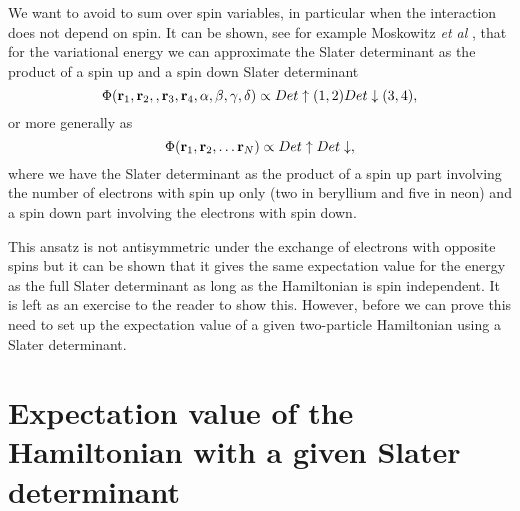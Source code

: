 We want to avoid to sum over spin variables, in particular when the interaction does not depend on spin.
It can be shown, see for example Moskowitz {\em et al} \cite{moskowitz1981,schmidt1982}, 
that for the variational energy
we can approximate the Slater determinant as  the product of a spin up and a spin down Slater determinant
\[
   \Phi({\bf r}_1,{\bf r}_2,,{\bf r}_3,{\bf r}_4, \alpha,\beta,\gamma,\delta) \propto Det\uparrow(1,2)Det\downarrow(3,4),
\]
or more generally as 
\[
   \Phi({\bf r}_1,{\bf r}_2,\dots {\bf r}_N) \propto Det\uparrow Det\downarrow,
\]
where we have the Slater determinant as the product of a spin up part involving the number of electrons 
with spin up only (two in beryllium
and five in neon) and a spin down part involving the electrons with spin down.

This ansatz is not antisymmetric under the exchange of electrons with  opposite spins but 
it can be shown that it gives the same
expectation value for the energy as the full Slater determinant
as long as the Hamiltonian is spin independent. It is left as an exercise to the reader to show this.
However, before  we can prove this need to set up the expectation value of a given two-particle Hamiltonian using a
Slater determinant.


\section{Expectation value of the Hamiltonian with a given Slater determinant}


